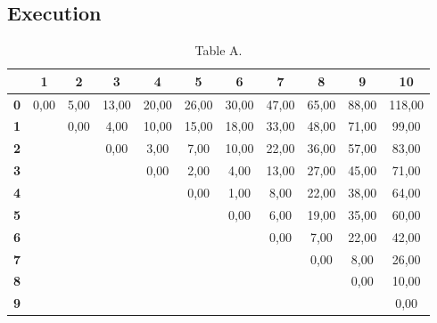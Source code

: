 \documentclass{article}
\begin{document}
\newpage
\newpage
\tableofcontents
\newpage

\subsection{Execution}
\begin{table}[!ht]
\begin{adjustwidth}{-3cm}{-3cm}
\centering
\begin{tabular}{c||c|c|c|c|c|c|c|c|c|c|}
\cline{2-11}
 & \cellcolor{gray90}\textbf{1} & \cellcolor{gray90}\textbf{2} & \cellcolor{gray90}\textbf{3} & \cellcolor{gray90}\textbf{4} & \cellcolor{gray90}\textbf{5} & \cellcolor{gray90}\textbf{6} & \cellcolor{gray90}\textbf{7} & \cellcolor{gray90}\textbf{8} & \cellcolor{gray90}\textbf{9} & \cellcolor{gray90}\textbf{10} \\
\hline\hline
\multicolumn{1}{|c||}{\cellcolor{gray90}\textbf{0}} & 0,00 & 5,00 & 13,00 & 20,00 & 26,00 & 30,00 & 47,00 & 65,00 & 88,00 & 118,00 \\ \hline
\multicolumn{1}{|c||}{\cellcolor{gray90}\textbf{1}} &  & 0,00 & 4,00 & 10,00 & 15,00 & 18,00 & 33,00 & 48,00 & 71,00 & 99,00 \\ \hline
\multicolumn{1}{|c||}{\cellcolor{gray90}\textbf{2}} &  &  & 0,00 & 3,00 & 7,00 & 10,00 & 22,00 & 36,00 & 57,00 & 83,00 \\ \hline
\multicolumn{1}{|c||}{\cellcolor{gray90}\textbf{3}} &  &  &  & 0,00 & 2,00 & 4,00 & 13,00 & 27,00 & 45,00 & 71,00 \\ \hline
\multicolumn{1}{|c||}{\cellcolor{gray90}\textbf{4}} &  &  &  &  & 0,00 & 1,00 & 8,00 & 22,00 & 38,00 & 64,00 \\ \hline
\multicolumn{1}{|c||}{\cellcolor{gray90}\textbf{5}} &  &  &  &  &  & 0,00 & 6,00 & 19,00 & 35,00 & 60,00 \\ \hline
\multicolumn{1}{|c||}{\cellcolor{gray90}\textbf{6}} &  &  &  &  &  &  & 0,00 & 7,00 & 22,00 & 42,00 \\ \hline
\multicolumn{1}{|c||}{\cellcolor{gray90}\textbf{7}} &  &  &  &  &  &  &  & 0,00 & 8,00 & 26,00 \\ \hline
\multicolumn{1}{|c||}{\cellcolor{gray90}\textbf{8}} &  &  &  &  &  &  &  &  & 0,00 & 10,00 \\ \hline
\multicolumn{1}{|c||}{\cellcolor{gray90}\textbf{9}} &  &  &  &  &  &  &  &  &  & 0,00 \\ \hline
\end{tabular}
\caption{Table A.}
\end{adjustwidth}
\end{table}
\end{document}
